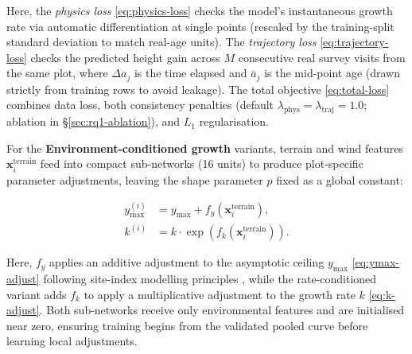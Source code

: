 Here, the \emph{physics loss} \eqref{eq:physics-loss} checks the model's instantaneous growth rate via automatic differentiation at single points (rescaled by the training-split standard deviation to match real-age units). The \emph{trajectory loss} \eqref{eq:trajectory-loss} checks the predicted height gain across $M$ consecutive real survey visits from the same plot, where $\Delta a_j$ is the time elapsed and $\bar{a}_j$ is the mid-point age (drawn strictly from training rows to avoid leakage). The total objective \eqref{eq:total-loss} combines data loss, both consistency penalties (default $\lambda_{\text{phys}}=\lambda_{\text{traj}}=1.0$; ablation in \S\ref{sec:rq1-ablation}), and $L_1$ regularisation.

For the \textbf{Environment-conditioned growth} variants, terrain and wind features $\mathbf{x}^{\text{terrain}}_i$ feed into compact sub-networks (16 units) to produce plot-specific parameter adjustments, leaving the shape parameter $p$ fixed as a global constant:

\begin{subequations}
\label{eq:env-adjustments}
\begin{align}
y_{\max}^{(i)} &= y_{\max} + f_{y}\!\left(\mathbf{x}^{\text{terrain}}_i\right), \label{eq:ymax-adjust} \\
k^{(i)} &= k \cdot \exp\!\left(f_{k}\!\left(\mathbf{x}^{\text{terrain}}_i\right)\right). \label{eq:k-adjust}
\end{align}
\end{subequations}

Here, $f_y$ applies an additive adjustment to the asymptotic ceiling $y_{\max}$ \eqref{eq:ymax-adjust} following site-index modelling principles \citep{socha2023Higher_C1_SS}, while the rate-conditioned variant adds $f_k$ to apply a multiplicative adjustment to the growth rate $k$ \eqref{eq:k-adjust}. Both sub-networks receive only environmental features and are initialised near zero, ensuring training begins from the validated pooled curve before learning local adjustments.

